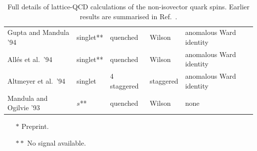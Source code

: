 \begin{table}[t]
{\begin{tabular}{lllll}
  Gupta and Mandula '94 \cite{Gupta:1994qw} &
  singlet** & quenched & Wilson & anomalous Ward identity \\

  Allés et al.\ '94 \cite{Alles:1994ss} &
  singlet** & quenched & Wilson & anomalous Ward identity \\

  Altmeyer et al.\ '94 \cite{Altmeyer:1992nt} &
  singlet & 4 staggered & staggered & anomalous Ward identity \\

  Mandula and Ogilvie '93 \cite{Mandula:1992bc} &
  $s$** & quenched & Wilson & none \\
  \hline
\end{tabular}
} %
\begin{minipage}{\linewidth}
{\footnotesize 
\begin{itemize}
\item[$*$] Preprint.
\item[$**$] No signal available.
\end{itemize}
}
\end{minipage}
\caption{\small Full details of lattice-QCD calculations of the non-isovector quark spins.
  Earlier results are summarised in Ref.~\cite{Liu:1995kb}.
\label{tablenonisovectorquarkspins}
}
\end{table}


